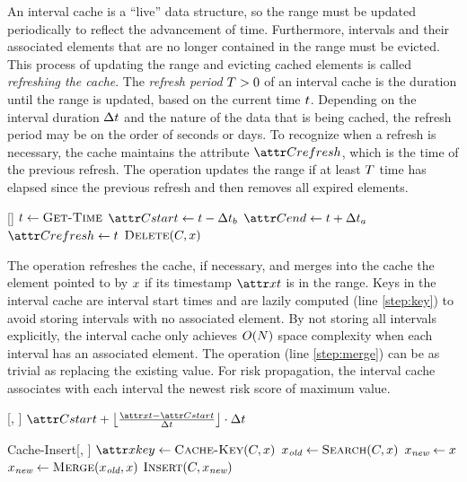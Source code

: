 An interval cache is a ``live'' data structure, so the range must be updated periodically to reflect the advancement of time. Furthermore, intervals and their associated elements that are no longer contained in the range must be evicted. This process of updating the range and evicting cached elements is called \emph{refreshing the cache}. The \emph{refresh period} $T > 0$ of an interval cache is the duration until the range is updated, based on the current time $t$. Depending on the interval duration ${\Delta}t$ and the nature of the data that is being cached, the refresh period may be on the order of seconds or days. To recognize when a refresh is necessary, the cache maintains the attribute $\aCacheRefresh$, which is the time of the previous refresh. The operation \cCacheRefresh updates the range if at least $T$ time has elapsed since the previous refresh and then removes all expired elements.
%
\begin{function}{\nCacheRefresh}[\vCache]
    \State $\vTime \assign \cGetTime$
    \If{$\vTime - \aCacheRefresh > \pCacheRefreshPeriod$}
    	\State $\aCacheStart \assign \vTime - \pCacheLookBack$
    	\State $\aCacheEnd \assign \vTime + \pCacheLookAhead$
    	\State $\aCacheRefresh \assign \vTime$
    	\ForEach{$\vCacheItem \in \vCache$}
    		\If{$\aCacheItemKey < \aCacheStart$}
    			\State $\cDelete[\vCache, \vCacheItem]$
    		\EndIf
    	\EndFor
    \EndIf
\end{function}

The operation \cCacheInsert refreshes the cache, if necessary, and merges into the cache the element pointed to by $x$ if its timestamp $\aCacheItemTime$ is in the range. Keys in the interval cache are interval start times and are lazily computed (line \ref{step:key}) to avoid storing intervals with no associated element. By not storing all intervals explicitly, the interval cache only achieves $O(N)$ space complexity when each interval has an associated element. The \cMerge operation (line \ref{step:merge}) can be as trivial as replacing the existing value. For risk propagation, the interval cache associates with each interval the newest risk score of maximum value.
%
\begin{function}{\nCacheKey}[\vCache, \vCacheItem]
    \State \Return $\aCacheStart + \floor{\frac{\aCacheItemTime - \aCacheStart}{\pDuration}} \cdot \pDuration$
\end{function}
%
\begin{function}{Cache-Insert}[\vCache, \vCacheItem]
    \If{$\aCacheItemTime \in [\aCacheStart, \aCacheEnd)$}
    	\State $\aCacheItemKey \assign \cCacheKey[\vCache, \vCacheItem]$ \label{step:key}
    	\State $\vOldCacheItem \assign \cSearch[\vCache, \vCacheItem]$
    	\If{$\vOldCacheItem \equals \nil$}
    		\State $x_{\textit{new}} \leftarrow x$
    	\Else
    		\State $\vNewCacheItem \assign \cMerge[\vOldCacheItem, \vCacheItem]$ \label{step:merge}
    	\EndIf
    	\State $\cInsert[\vCache, \vNewCacheItem]$
    \EndIf
\end{function}


